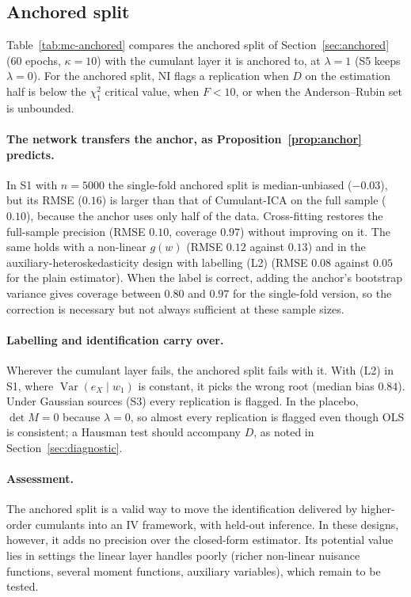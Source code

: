 \documentclass[11pt]{article}
\theoremstyle{definition}
\theoremstyle{remark}
\newcommand{\Var}{\operatorname{Var}}
\begin{document}
\subsection{Anchored split}\label{sec:anchored-mc}

Table~\ref{tab:mc-anchored} compares the anchored split of Section~\ref{sec:anchored} (60 epochs,
$\kappa=10$) with the cumulant layer it is anchored to, at $\lambda=1$ (S5 keeps $\lambda=0$).
For the anchored split, NI flags a replication when $D$ on the estimation half is below the
$\chi^2_1$ critical value, when $F<10$, or when the Anderson--Rubin set is unbounded.



\paragraph{The network transfers the anchor, as Proposition~\ref{prop:anchor} predicts.} In S1
with $n=5000$ the single-fold anchored split is median-unbiased ($-0.03$), but its RMSE ($0.16$) is
larger than that of Cumulant-ICA on the full sample ($0.10$), because the anchor uses only half of the
data. Cross-fitting restores the full-sample precision (RMSE $0.10$, coverage $0.97$) without
improving on it. The same holds with a non-linear $g(w)$ (RMSE $0.12$ against $0.13$) and in the
auxiliary-heteroskedasticity design with labelling (L2) (RMSE $0.08$ against $0.05$ for the plain
estimator). When the label is correct, adding the anchor's bootstrap variance gives coverage between $0.80$
and $0.97$ for the single-fold version, so the correction is necessary but not always sufficient at these sample sizes.

\paragraph{Labelling and identification carry over.} Wherever the cumulant layer fails, the anchored
split fails with it. With (L2) in S1, where $\Var(e_X\mid w_1)$ is constant, it picks the wrong root
(median bias $0.84$). Under Gaussian sources (S3) every replication is flagged. In the placebo,
$\det M=0$ because $\lambda=0$, so almost every replication is flagged even though OLS is
consistent; a Hausman test should accompany $D$, as noted in Section~\ref{sec:diagnostic}.

\paragraph{Assessment.} The anchored split is a valid way to move the identification delivered by
higher-order cumulants into an IV framework, with held-out inference. In these designs, however,
it adds no precision over the closed-form estimator. Its potential value lies in settings the
linear layer handles poorly (richer non-linear nuisance functions, several moment functions,
auxiliary variables), which remain to be tested.
\end{document}
